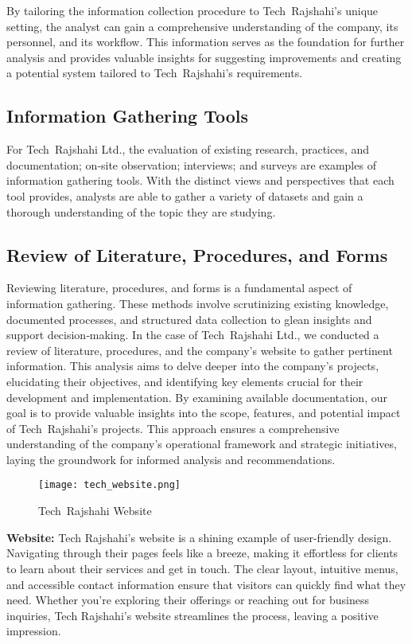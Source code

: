 \documentclass[12pt,a4paper]{article}
\begin{document}
By tailoring the information collection procedure to Tech Rajshahi’s unique setting, the analyst can gain a comprehensive understanding of the company, its personnel, and its workflow.  This information serves as the foundation for further analysis and provides valuable insights for suggesting improvements and creating a potential system tailored to Tech Rajshahi’s requirements.

\subsection{Information Gathering Tools}
For Tech Rajshahi Ltd., the evaluation of existing research, practices, and documentation; on‑site observation; interviews; and surveys are examples of information gathering tools.  With the distinct views and perspectives that each tool provides, analysts are able to gather a variety of datasets and gain a thorough understanding of the topic they are studying.

\subsection{Review of Literature, Procedures, and Forms}
Reviewing literature, procedures, and forms is a fundamental aspect of information gathering.  These methods involve scrutinizing existing knowledge, documented processes, and structured data collection to glean insights and support decision‑making.  In the case of Tech Rajshahi Ltd., we conducted a review of literature, procedures, and the company’s website to gather pertinent information.  This analysis aims to delve deeper into the company’s projects, elucidating their objectives, and identifying key elements crucial for their development and implementation.  By examining available documentation, our goal is to provide valuable insights into the scope, features, and potential impact of Tech Rajshahi’s projects.  This approach ensures a comprehensive understanding of the company’s operational framework and strategic initiatives, laying the groundwork for informed analysis and recommendations.

\begin{figure}[H]
    \centering
    \texttt{[image: tech\_website.png]}
    \caption{Tech Rajshahi Website}
    \label{fig:tech_website}
\end{figure}

\textbf{Website:} Tech Rajshahi’s website is a shining example of user-friendly design. Navigating through their pages feels like a breeze, making it effortless for clients to learn about their services and get in touch. The clear layout, intuitive menus, and accessible contact information ensure that visitors can quickly find what they need. Whether you’re exploring their offerings or reaching out for business inquiries, Tech Rajshahi’s website streamlines the process, leaving a positive impression. 
\end{document}
